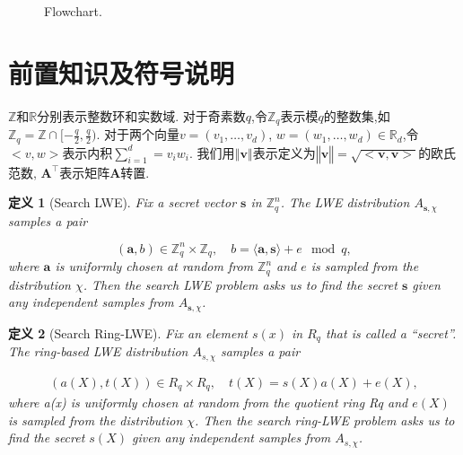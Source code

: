 \documentclass[12pt,a4paper]{article}
\newtheorem{definition}{定义} %
\numberwithin{equation}{section}
\begin{document}
\begin{figure}[htbp]
\begin{center}
\begin{tikzpicture}



\end{tikzpicture}
    
\end{center}
    \caption{Flowchart.}
    \label{fig:flowchart}
\end{figure}




\section{前置知识及符号说明}
$\mathbb{Z}$和$\mathbb{R}$分别表示整数环和实数域.
对于奇素数$q$,令$\mathbb{Z}_q$表示模$q$的整数集,如$\mathbb{Z}_q = \mathbb{Z}\cap[-\frac{q}{2},\frac{q}{2})$.
对于两个向量$v =(v_1 , \ldots , v_d)$, $w = ( w_1 , \ldots , w_d) \in \mathbb{R}_d$,令$<v,w>$表示内积$ \sum_{i=1}^{d}= v_iw_i$.
我们用$‖\mathbf{v}‖$表示定义为$‖\mathbf{v}‖=\sqrt{<\mathbf{v},\mathbf{v}>}$的欧氏范数, $\mathbf{A}^\top$表示矩阵$\mathbf{A}$转置.

\begin{definition}[Search LWE]
Fix a secret vector $\mathbf{s}$ in $\mathbb{Z}_q^n$.  
The LWE distribution $A_{\mathbf{s},\chi}$ samples a pair  

\[
(\mathbf{a}, b) \in \mathbb{Z}_q^n \times \mathbb{Z}_q, \quad b = \langle \mathbf{a}, \mathbf{s} \rangle + e \mod q,
\]  
where $\mathbf{a}$ is uniformly chosen at random from $\mathbb{Z}_q^n$ and $e$ is sampled from the distribution $\chi$. Then the search LWE problem asks us to find the secret $\mathbf{s}$ given any independent samples from $A_{\mathbf{s},\chi}$.  
\end{definition}

\begin{definition}[Search Ring-LWE]
Fix an element $s(x)$ in $R_q$ that is called a “secret”. 
The ring-based LWE distribution $A_{s,\chi}$ samples a pair

\begin{align*}
    (a(X), t(X)) \in R_q \times R_q, \quad t(X) = s(X)a(X) + e(X),
\end{align*}
where a(x) is uniformly chosen at random from the quotient ring Rq and $e(X)$ is sampled from the distribution $\chi$. Then the search ring-LWE problem asks us to find the secret $s(X)$ given any independent samples from $A_{s,\chi}$.
\end{definition}
\end{document}
